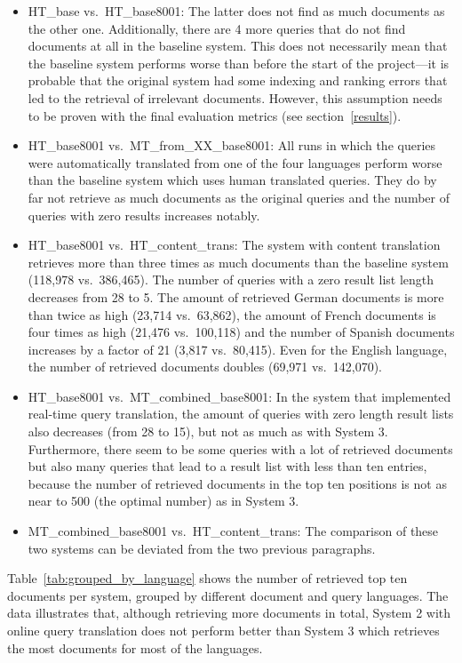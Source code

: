 \documentclass[a4paper,11pt]{article}
\begin{document}
\begin{itemize}
    \item HT\_base vs.\ HT\_base8001: The latter does not find as much documents as the other one. Additionally, there are 4 more queries that do not find documents at all in the baseline system. This does not necessarily mean that the baseline system performs worse than before the start of the project---it is probable that the original system had some indexing and ranking errors that led to the retrieval of irrelevant documents. However, this assumption needs to be proven with the final evaluation metrics (see section~\ref{results}).
    \item HT\_base8001 vs.\ MT\_from\_XX\_base8001: All runs in which the queries were automatically translated from one of the four languages perform worse than the baseline system which uses human translated queries. They do by far not retrieve as much documents as the original queries and the number of queries with zero results increases notably.
    \item HT\_base8001 vs.\ HT\_content\_trans: The system with content translation retrieves more than three times as much documents than the baseline system (118,978 vs.\ 386,465). The number of queries with a zero result list length decreases from 28 to 5. The amount of retrieved German documents is more than twice as high (23,714 vs.\ 63,862), the amount of French documents is four times as high (21,476 vs.\ 100,118) and the number of Spanish documents increases by a factor of 21 (3,817 vs.\ 80,415). Even for the English language, the number of retrieved documents doubles (69,971 vs.\ 142,070).
    \item HT\_base8001 vs.\ MT\_combined\_base8001: In the system that implemented real-time query translation, the amount of queries with zero length result lists also decreases (from 28 to 15), but not as much as with System 3. Furthermore, there seem to be some queries with a lot of retrieved documents but also many queries that lead to a result list with less than ten entries, because the number of retrieved documents in the top ten positions is not as near to 500 (the optimal number) as in System 3.
    \item MT\_combined\_base8001 vs.\ HT\_content\_trans: The comparison of these two systems can be deviated from the two previous paragraphs.
\end{itemize}

Table~\ref{tab:grouped_by_language} shows the number of retrieved top ten documents per system, grouped by different document and query languages. The data illustrates that, although retrieving more documents in total, System 2 with online query translation does not perform better than System 3 which retrieves the most documents for most of the languages. 
\end{document}
